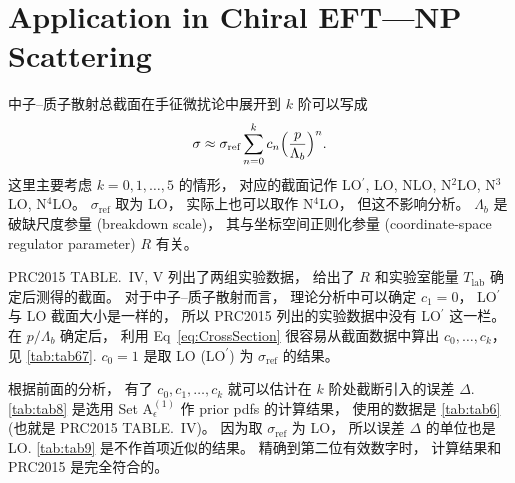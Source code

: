 
\section{Application in Chiral EFT---NP Scattering}

中子--质子散射总截面在手征微扰论中展开到 $k$ 阶可以写成
\begin{equation}
  \label{eq:CrossSection}
\sigma \approx \sigma_{\textrm{ref}}\sum_{n=0}^k c_n
\Bigl( \frac{p}{\Lambda_b} \Bigr)^n.
\end{equation}
这里主要考虑 $k=0,1,\ldots,5$ 的情形，
对应的截面记作 LO${}^\prime$, LO, NLO, N${}^2$LO, N${}^3$LO, N${}^4$LO。
$\sigma_{\textrm{ref}}$ 取为 LO，
实际上也可以取作 N${}^4$LO，
但这不影响分析。
$\Lambda_b$ 是破缺尺度参量 (breakdown scale)，
其与坐标空间正则化参量 (coordinate-space regulator parameter) $R$ 有关。

PRC2015 TABLE.~IV, V 列出了两组实验数据，
给出了 $R$ 和实验室能量 $T_{\textrm{lab}}$ 确定后测得的截面。
对于中子--质子散射而言，
理论分析中可以确定 $c_1=0$，
LO${}^\prime$ 与 LO 截面大小是一样的，
所以 PRC2015 列出的实验数据中没有 LO${}^\prime$ 这一栏。
在 $p/\Lambda_b$ 确定后，
利用 Eq~\eqref{eq:CrossSection} 很容易从截面数据中算出 $c_0,\ldots, c_k$，
见 \autoref{tab:tab67}.
$c_0=1$ 是取 LO (LO${}^\prime$) 为 $\sigma_{\textrm{ref}}$ 的结果。

根据前面的分析，
有了 $c_0,c_1,\ldots,c_k$ 就可以估计在 $k$ 阶处截断引入的误差 $\Delta$.
\autoref{tab:tab8} 是选用 Set A${}_{\epsilon}^{(1)}$ 作 prior pdfs 的计算结果，
使用的数据是 \autoref{tab:tab6} (也就是 PRC2015 TABLE.~IV)。
因为取 $\sigma_{\textrm{ref}}$ 为 LO，
所以误差 $\Delta$ 的单位也是 LO.
\autoref{tab:tab9} 是不作首项近似的结果。
精确到第二位有效数字时，
计算结果和 PRC2015 是完全符合的。
